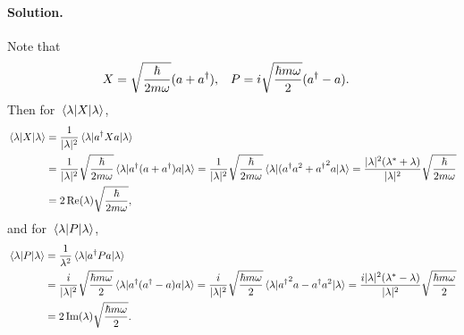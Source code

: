 \documentclass[11pt]{article}
\newenvironment{solution}
{
    \paragraph{Solution.}
    \ignorespaces
}
{
}
\begin{document}
\begin{solution}
	Note that
	\begin{align*}
		X &= \sqrt{\frac{\hbar}{2 m \omega}} (a + a^\dagger), &
		P &= i \sqrt{\frac{\hbar m \omega}{2}} (a^\dagger - a).
	\end{align*}
	Then for $\ev{X}{\lam}$,
	\begin{align}
		\ev{X}{\lam} &= \frac{1}{|\lam|^2} \ev{\ad X a}{\lam} \notag \\
		&= \frac{1}{|\lam|^2} \sqrt{\frac{\hbar}{2 m \omega}} \ev{\ad (a + \ad) a}{\lam}
		= \frac{1}{|\lam|^2} \sqrt{\frac{\hbar}{2 m \omega}} \ev{(\ad a^2 + {\ad}^2 a}{\lam}
		= \frac{|\lam|^2 (\lam^* + \lam)}{|\lam|^2} \sqrt{\frac{\hbar}{2 m \omega}} \notag \\
		&= 2 \Re(\lam) \sqrt{\frac{\hbar}{2 m \omega}}, \label{evX}
	\end{align}
	and for $\ev{P}{\lam}$,
	\begin{align}
		\ev{P}{\lam} &= \frac{1}{\lambda^2} \ev{\ad P a}{\lam} \notag \\
		&= \frac{i}{|\lam|^2} \sqrt{\frac{\hbar m \omega}{2}} \ev{\ad(\ad - a)a}{\lam} = \frac{i}{|\lam|^2} \sqrt{\frac{\hbar m \omega}{2}} \ev{{\ad}^2 a - \ad a^2}{\lam}
		= \frac{i |\lam|^2 (\lam^* - \lam)}{|\lam|^2} \sqrt{\frac{\hbar m \omega}{2}} \notag \\
		&= 2 \Im(\lam) \sqrt{\frac{\hbar m \omega}{2}}. \label{evP}
	\end{align}
	

\end{solution}
\end{document}
